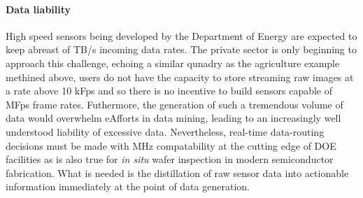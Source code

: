 \documentclass{article}
\begin{document}



\paragraph{Data liability}
High speed sensors being developed by the Department of Energy are expected to keep abreast of TB/s incoming data rates.
The private sector is only beginning to approach this challenge, echoing a similar qunadry as the agriculture example methined above, users do not have the capacity to store streaming raw images at a rate above 10 kFps and so there is no incentive to build sensors capable of MFps frame rates.
Futhermore, the generation of such a tremendous volume of data would overwhelm eAfforts in data mining, leading to an increasingly well understood liability of excessive data. 
Nevertheless, real-time data-routing decisions must be made with MHz compatability at the cutting edge of DOE facilities as is also true for \textit{in situ} wafer inspection in modern semiconductor fabrication.
What is needed is the distillation of raw sensor data into actionable information immediately at the point of data generation.
\end{document}
